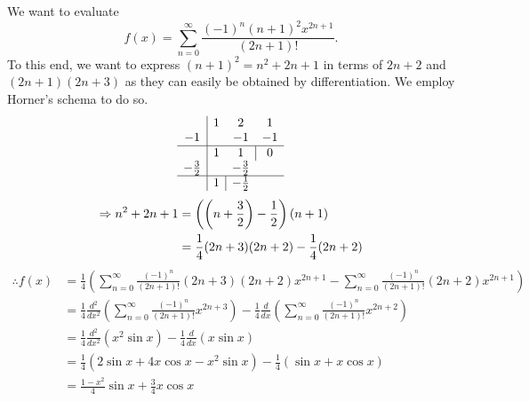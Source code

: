 \item

We want to evaluate
\[
	f(x) = \sum_{n = 0}^\infty \frac{{(-1)}^n {(n + 1)}^2 x^{2n + 1}}{(2n + 1)!}.
\]
To this end, we want to express ${(n + 1)}^2 = n^2 + 2n + 1$ in terms of $2n + 2$ and $(2n + 1)(2n + 3)$
as they can easily be obtained by differentiation.
We employ Horner's schema to do so.
\[
	\begin{array}{ c | c c c }
	       & 1 &  2 &  1 \\
	    -1 &   & -1 & -1 \\
		\hline
		   & 1 &  1 & \multicolumn{1}{|c}{0} \\
		-\frac{3}{2} & & -\frac{3}{2} & \\
		\hline
		   & 1 & \multicolumn{1}{|c}{-\half} &
	\end{array}
\]
\begin{align*}
	\Rightarrow n^2 + 2n + 1
	&= \left( \left( n + \frac{3}{2} \right) - \frac{1}{2} \right) (n + 1) \\
	&= \frac{1}{4} (2n + 3) (2n + 2) - \frac{1}{4} (2n + 2)
\end{align*}
\begin{align*}
	\therefore f(x)
	&= \frac{1}{4} \left(
		\sum_{n = 0}^\infty \frac{{(-1)}^n}{(2n + 1)!} (2n + 3) (2n + 2) x^{2n + 1}
	  - \sum_{n = 0}^\infty \frac{{(-1)}^n}{(2n + 1)!} (2n + 2) x^{2n + 1}
	  \right) \\
	&= \frac{1}{4} \frac{d^2}{dx^2} \left( \sum_{n = 0}^\infty \frac{{(-1)}^n}{(2n + 1)!} x^{2n + 3} \right)
	  -\frac{1}{4} \frac{d}{dx} \left( \sum_{n = 0}^\infty \frac{{(-1)}^n}{(2n + 1)!} x^{2n + 2} \right) \\
	&= \frac{1}{4} \frac{d^2}{dx^2} \left( x^2 \sin x \right) - \frac{1}{4} \frac{d}{dx} \left( x \sin x \right) \\
	&= \frac{1}{4} \left( 2\sin x + 4x\cos x - x^2 \sin x \right) - \frac{1}{4} \left( \sin x + x \cos x \right) \\
	&= \frac{1 - x^2}{4} \sin x + \frac{3}{4} x \cos x
\end{align*}